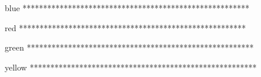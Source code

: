 \documentclass{article}
\begin{document}
	
	\lipsum[1]
	
	\begin{example}{blue}
	*******************************************************
	\end{example}

	\begin{solution}{red}
	*******************************************************
	\end{solution}
	
	\begin{example}{green}
	*******************************************************
	\end{example}
	
	\begin{solution}{yellow}
	*******************************************************
	\end{solution}
	
\end{document}
